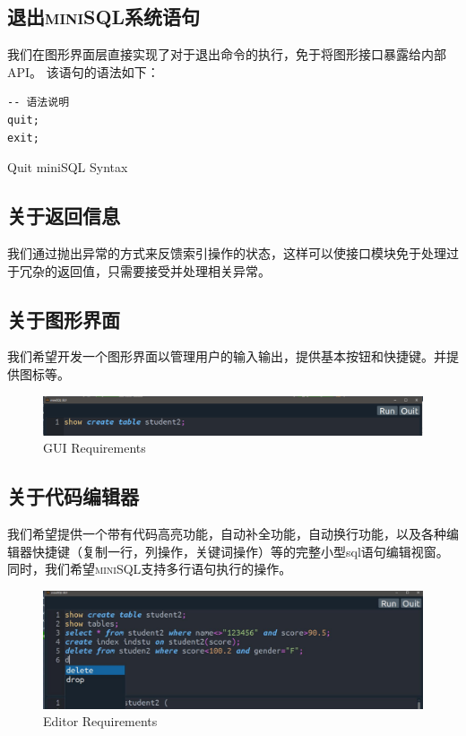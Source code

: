 \documentclass[UTF8]{ctexrep} %
\newenvironment{longlisting}{\captionsetup{type=listing}}{}
\begin{document}
\subsection{退出\textsc{miniSQL}系统语句}
我们在图形界面层直接实现了对于退出命令的执行，免于将图形接口暴露给内部API。
该语句的语法如下：
\begin{longlisting}
    \begin{verbatim}
-- 语法说明
quit;
exit;
    \end{verbatim}
    \caption{Quit miniSQL Syntax}
    \label{lst:quit_miniSQL_requirements}
\end{longlisting}

\subsection{关于返回信息}
我们通过抛出异常的方式来反馈索引操作的状态，这样可以使接口模块免于处理过于冗杂的返回值，只需要接受并处理相关异常。

\subsection{关于图形界面}
我们希望开发一个图形界面以管理用户的输入输出，提供基本按钮和快捷键。并提供图标等。
\begin{figure}[H]
    \centering
    \includegraphics[width=\linewidth]{figure/gui_requirements.png}
    \caption{GUI Requirements}
    \label{fig:gui_requirements}
\end{figure}
\subsection{关于代码编辑器}
我们希望提供一个带有代码高亮功能，自动补全功能，自动换行功能，以及各种编辑器快捷键（复制一行，列操作，关键词操作）等的完整小型sql语句编辑视窗。
同时，我们希望\textsc{miniSQL}支持多行语句执行的操作。
\begin{figure}[H]
    \centering
    \includegraphics[width=\linewidth]{figure/editor_requirements.jpg}
    \caption{Editor Requirements}
    \label{fig:editor_requirements}
\end{figure}
\end{document}
